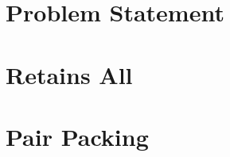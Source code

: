 \documentclass{beamer}
\begin{document}


\section{Problem Statement}



\section{Retains All}





\section{Pair Packing}



% 
% 

% 
\end{document}
